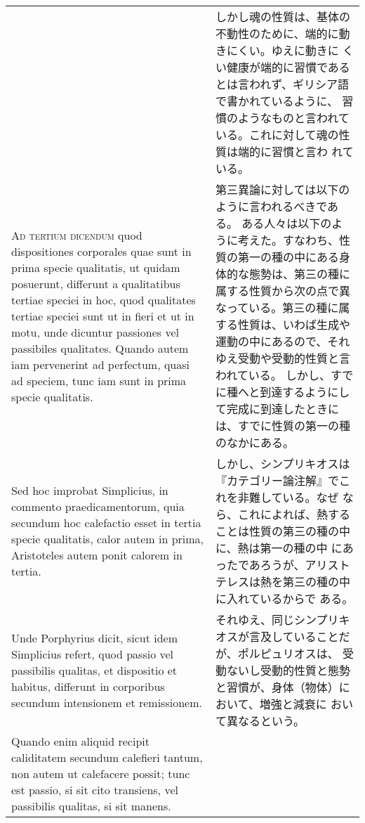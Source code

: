\documentclass[10pt]{jsarticle} %
\begin{document}
\begin{longtable}{p{21em}p{21em}}
&

しかし魂の性質は、基体の不動性のために、端的に動きにくい。ゆえに動きに
くい健康が端的に習慣であるとは言われず、ギリシア語で書かれているように、
習慣のようなものと言われている。これに対して魂の性質は端的に習慣と言わ
れている。

\\


{\scshape Ad tertium dicendum} quod dispositiones
corporales quae sunt in prima specie qualitatis, ut quidam posuerunt,
differunt a qualitatibus tertiae speciei in hoc, quod qualitates
tertiae speciei sunt ut in fieri et ut in motu, unde dicuntur
passiones vel passibiles qualitates. 
Quando autem iam pervenerint ad
perfectum, quasi ad speciem, tunc iam sunt in prima specie
qualitatis.

&

第三異論に対しては以下のように言われるべきである。
ある人々は以下のように考えた。すなわち、性質の第一の種の中にある身体的な態勢は、第三の種に属する性質から次の点で異なっている。第三の種に属する性質は、いわば生成や運動の中にあるので、それゆえ受動や受動的性質と言われている。
しかし、すでに種へと到達するようにして完成に到達したときには、すでに性質の第一の種のなかにある。
\\


Sed hoc improbat Simplicius, in commento praedicamentorum, quia
secundum hoc calefactio esset in tertia specie qualitatis, calor autem
in prima, Aristoteles autem ponit calorem in tertia.


&


しかし、シンプリキオスは『カテゴリー論注解』でこれを非難している。なぜ
なら、これによれば、熱することは性質の第三の種の中に、熱は第一の種の中
にあったであろうが、アリストテレスは熱を第三の種の中に入れているからで
ある。

\\

Unde
Porphyrius dicit, sicut idem Simplicius refert, quod passio vel
passibilis qualitas, et dispositio et habitus, differunt in corporibus
secundum intensionem et remissionem. 



&

それゆえ、同じシンプリキオスが言及していることだが、ポルピュリオスは、
受動ないし受動的性質と態勢と習慣が、身体（物体）において、増強と減衰に
おいて異なるという。

\\

Quando enim aliquid recipit
caliditatem secundum calefieri tantum, non autem ut calefacere possit;
tunc est passio, si sit cito transiens, vel passibilis qualitas, si
sit manens. 


\end{longtable}
\end{document}

